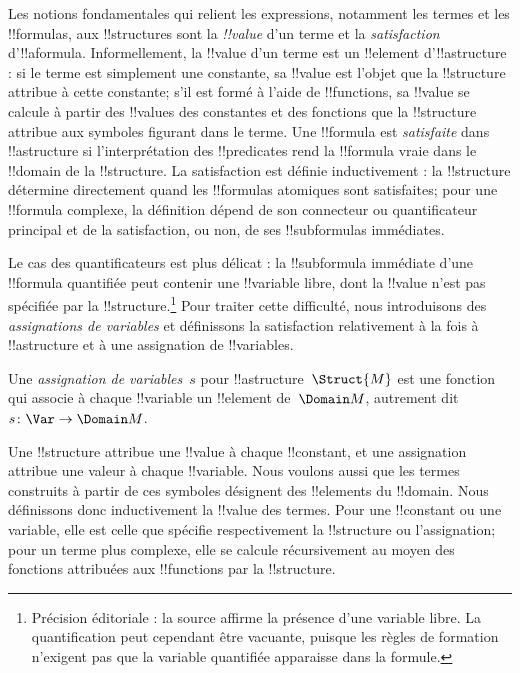 \documentclass[../../../include/open-logic-section]{subfiles}
\begin{document}


\begin{explain}
Les notions fondamentales qui relient les expressions, notamment les
termes et les !!{formula}s, aux !!{structure}s sont la
\emph{!!{value}} d'un terme et la \emph{satisfaction} d'!!a{formula}.
Informellement, la !!{value} d'un terme est un !!{element} d'!!a{structure} :
si le terme est simplement une constante, sa !!{value} est l'objet
que la !!{structure} attribue à cette constante; s'il est formé à
l'aide de !!{function}s, sa !!{value} se calcule à partir des
!!{value}s des constantes et des fonctions que la !!{structure}
attribue aux symboles figurant dans le terme. Une !!{formula} est
\emph{satisfaite} dans !!a{structure} si l'interprétation des
!!{predicate}s rend la !!{formula} vraie dans le !!{domain} de la
!!{structure}. La satisfaction est définie inductivement : la
!!{structure} détermine directement quand les !!{formula}s atomiques
sont satisfaites; pour une !!{formula} complexe, la définition dépend
de son connecteur ou quantificateur principal et de la satisfaction,
ou non, de ses !!{subformula}s immédiates.

Le cas des quantificateurs est plus délicat : la !!{subformula}
immédiate d'une !!{formula} quantifiée peut contenir une !!{variable}
libre, dont la !!{value} n'est pas spécifiée par la !!{structure}.\footnote{Précision éditoriale : la source affirme la présence d'une variable libre. La quantification peut cependant être vacuante, puisque les règles de formation n'exigent pas que la variable quantifiée apparaisse dans la formule.}
Pour traiter cette difficulté, nous introduisons des
\emph{assignations de variables} et définissons la satisfaction
relativement à la fois à !!a{structure} et à une assignation de
!!{variable}s.
\end{explain}

\begin{defn}
Une \emph{assignation de variables}~$s$ pour !!a{structure}~$\Struct{M}$
est une fonction qui associe à chaque !!{variable} un !!{element}
de~$\Domain M$, autrement dit $s\colon \Var \to \Domain M$.
\end{defn}

\begin{explain}
Une !!{structure} attribue une !!{value} à chaque !!{constant}, et une
assignation attribue une valeur à chaque !!{variable}. Nous voulons aussi que
les termes construits à partir de ces symboles désignent des
!!{element}s du !!{domain}. Nous définissons donc inductivement la
!!{value} des termes. Pour une !!{constant} ou une variable, elle
est celle que spécifie respectivement la !!{structure} ou l'assignation;
pour un terme plus complexe, elle se calcule récursivement au moyen des
fonctions attribuées aux !!{function}s par la !!{structure}.
\end{explain}
\end{document}
